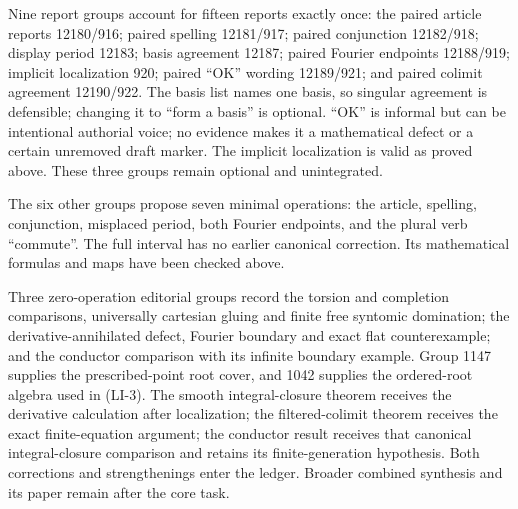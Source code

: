 Nine report groups account for fifteen reports exactly once: the paired article reports 12180/916; paired spelling 12181/917; paired conjunction 12182/918; display period 12183; basis agreement 12187; paired Fourier endpoints 12188/919; implicit localization 920; paired ``OK'' wording 12189/921; and paired colimit agreement 12190/922. The basis list names one basis, so singular agreement is defensible; changing it to ``form a basis'' is optional. ``OK'' is informal but can be intentional authorial voice; no evidence makes it a mathematical defect or a certain unremoved draft marker. The implicit localization is valid as proved above. These three groups remain optional and unintegrated.

The six other groups propose seven minimal operations: the article, spelling, conjunction, misplaced period, both Fourier endpoints, and the plural verb ``commute''. The full interval has no earlier canonical correction. Its mathematical formulas and maps have been checked above.

Three zero-operation editorial groups record the torsion and completion comparisons, universally cartesian gluing and finite free syntomic domination; the derivative-annihilated defect, Fourier boundary and exact flat counterexample; and the conductor comparison with its infinite boundary example. Group 1147 supplies the prescribed-point root cover, and 1042 supplies the ordered-root algebra used in (LI-3). The smooth integral-closure theorem receives the derivative calculation after localization; the filtered-colimit theorem receives the exact finite-equation argument; the conductor result receives that canonical integral-closure comparison and retains its finite-generation hypothesis. Both corrections and strengthenings enter the ledger. Broader combined synthesis and its paper remain after the core task.
